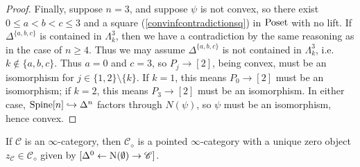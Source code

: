 \documentclass{tac}
\newcommand{\s}[1]{\mathscr{#1}}
\newcommand{\tx}[1]{\textnormal{#1}}
\begin{document}
\begin{proof}
Finally, suppose $n=3$, and suppose $\psi$ is not convex, so there exist $0\leq a<b<c \leq 3$ and a square (\ref{convinfcontradictionsq}) in $\tx{Poset}$ with no lift.  If $\Delta^{\{a,b,c \}}$ is contained in $\Lambda^3_k$, then we have a contradiction by the same reasoning as in the case of $n\geq 4$.  Thus we may assume $\Delta^{\{a,b,c \}}$ is not contained in $\Lambda^3_k$, i.e. $k\not\in \{a,b,c\}$.  Thus $a=0$ and $c=3$, so $P_j \to [2]$, being convex, must be an isomorphism for $j\in \{1,2 \}\setminus \{k\}$.  If $k=1$, this means $P_0 \to [2]$ must be an isomorphism; if $k=2$, this means $P_3 \to [2]$ must be an isomorphism.  In either case, $\tx{Spine}[n] \hookrightarrow \Delta^n$ factors through $N(\psi)$, so $\psi$ must be an isomorphism, hence convex.
\end{proof}
\begin{corollary}\label{diamondhaszerocor} If $\s{C}$ is an $\infty$-category, then $\s{C}_\diamond$ is a pointed $\infty$-category with a unique zero object $z_\s{C} \in \s{C}_\diamond$ given by $[ \Delta^0 \leftarrow \tx{N}(\emptyset) \to \s{C} ]$.
\end{corollary}
\end{document}
